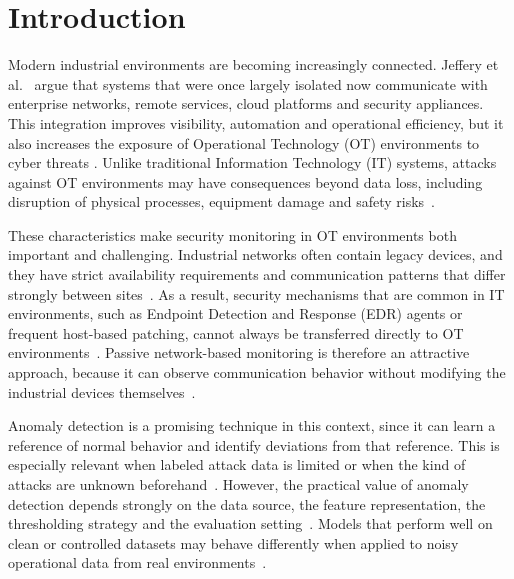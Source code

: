 \chapter{Introduction}
\label{ch:introduction}
Modern industrial environments are becoming increasingly connected. Jeffery et al.~\cite{jeffrey_hybrid_2024} argue that systems that were once largely isolated now communicate with enterprise networks, remote services, cloud platforms and security appliances. This integration improves visibility, automation and operational efficiency, but it also increases the exposure of Operational Technology (OT) environments to cyber threats \cite{behdadnia_early-stage_2025}. Unlike traditional Information Technology (IT) systems, attacks against OT environments may have consequences beyond data loss, including disruption of physical processes, equipment damage and safety risks~\cite{wang_guardians_2026, jeffrey_hybrid_2024}.

These characteristics make security monitoring in OT environments both important and challenging. Industrial networks often contain legacy devices, and they have strict availability requirements and communication patterns that differ strongly between sites~\cite{abshari_survey_2025, jeffrey_hybrid_2024}. As a result, security mechanisms that are common in IT environments, such as Endpoint Detection and Response (EDR) agents or frequent host-based patching, cannot always be transferred directly to OT environments~\cite{wang_guardians_2026}. Passive network-based monitoring is therefore an attractive approach, because it can observe communication behavior without modifying the industrial devices themselves~\cite{ortega-fernandez_network_2024}.

Anomaly detection is a promising technique in this context, since it can learn a reference of normal behavior and identify deviations from that reference. This is especially relevant when labeled attack data is limited or when the kind of attacks are unknown beforehand~\cite{jeffrey_hybrid_2024, meira_performance_2020}. However, the practical value of anomaly detection depends strongly on the data source, the feature representation, the thresholding strategy and the evaluation setting~\cite{fung_perspectives_2022}. Models that perform well on clean or controlled datasets may behave differently when applied to noisy operational data from real environments~\cite{catillo_cps-guard_2023, moriano_adaptive_2025}.

